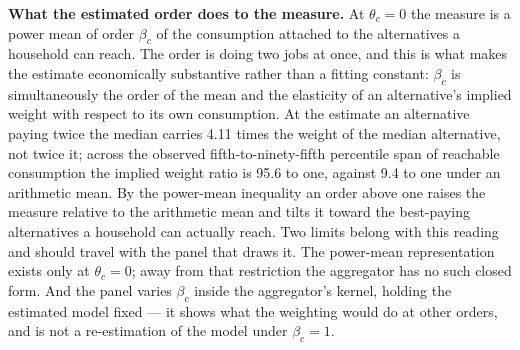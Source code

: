 \documentclass[11pt,a4paper]{article}
\begin{document}
\textbf{What the estimated order does to the measure.} At \(\theta_c=0\) the measure is a power mean of order \(\beta_c\) of the consumption attached to the alternatives a household can reach. The order is doing two jobs at once, and this is what makes the estimate economically substantive rather than a fitting constant: \(\beta_c\) is simultaneously the order of the mean and the elasticity of an alternative's implied weight with respect to its own consumption. At the estimate an alternative paying twice the median carries 4.11 times the weight of the median alternative, not twice it; across the observed fifth-to-ninety-fifth percentile span of reachable consumption the implied weight ratio is 95.6 to one, against 9.4 to one under an arithmetic mean. By the power-mean inequality an order above one raises the measure relative to the arithmetic mean and tilts it toward the best-paying alternatives a household can actually reach. Two limits belong with this reading and should travel with the panel that draws it. The power-mean representation exists only at \(\theta_c=0\); away from that restriction the aggregator has no such closed form. And the panel varies \(\beta_c\) inside the aggregator's kernel, holding the estimated model fixed --- it shows what the weighting would do at other orders, and is not a re-estimation of the model under \(\beta_c=1\).
\end{document}

